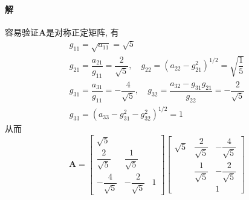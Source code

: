 \documentclass[12pt, a4paper, oneside, fontset=none]{ctexart}
\begin{document}
\paragraph*{解} 容易验证$\bm{A}$是对称正定矩阵, 有
\begin{gather*}
    g_{11} = \sqrt{a_{11}} = \sqrt{5} \\
    g_{21} = \dfrac{a_{21}}{g_{11}} = \dfrac{2}{\sqrt{5}}, \quad g_{22} = (a_{22} - g_{21}^2)^{1/2} = \sqrt{\dfrac{1}{5}} \\
    g_{31} = \dfrac{a_{31}}{g_{11}} = -\dfrac{4}{\sqrt{5}}, \quad g_{32} = \dfrac{a_{32} - g_{31}g_{21}}{g_{22}} = -\dfrac{2}{\sqrt{5}} \\
    g_{33} = (a_{33} - g_{31}^2 - g_{32}^2)^{1/2} = 1
\end{gather*}
从而
\[
    \bm{A} = \begin{bmatrix}
        \sqrt{5}             &                      &   \\
        \dfrac{2}{\sqrt{5}}  & \dfrac{1}{\sqrt{5}}  &   \\
        -\dfrac{4}{\sqrt{5}} & -\dfrac{2}{\sqrt{5}} & 1
    \end{bmatrix} \begin{bmatrix}
        \sqrt{5} & \dfrac{2}{\sqrt{5}} & -\dfrac{4}{\sqrt{5}} \\
                 & \dfrac{1}{\sqrt{5}} & -\dfrac{2}{\sqrt{5}} \\
                 &                     & 1
    \end{bmatrix}
\]
\end{document}
